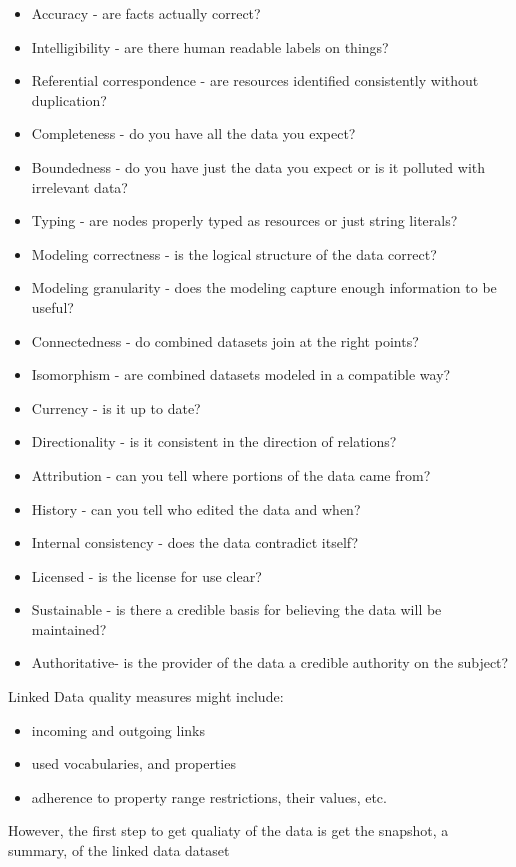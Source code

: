 \begin{itemize}
	\item Accuracy - are facts actually correct?
	\item Intelligibility - are there human readable labels on things?
	\item Referential correspondence - are resources identified consistently without duplication?
	\item Completeness - do you have all the data you expect?
	\item Boundedness - do you have just the data you expect or is it polluted with irrelevant data?
	\item Typing - are nodes properly typed as resources or just string literals?
	\item Modeling correctness - is the logical structure of the data correct?
	\item Modeling granularity - does the modeling capture enough information to be useful?
	\item Connectedness - do combined datasets join at the right points?
	\item Isomorphism - are combined datasets modeled in a compatible way?
	\item Currency - is it up to date?
	\item Directionality - is it consistent in the direction of relations?
	\item Attribution - can you tell where portions of the data came from?
	\item History - can you tell who edited the data and when?
	\item Internal consistency - does the data contradict itself?
	\item Licensed - is the license for use clear?
	\item Sustainable - is there a credible basis for believing the data will be maintained?
	\item Authoritative- is the provider of the data a credible authority on the subject?
\end{itemize}

Linked Data quality measures might include:
\begin{itemize}
	\item incoming and outgoing links
	\item used vocabularies, and properties
	\item adherence to property range restrictions, their values, etc.
\end{itemize}

However, the first step to get qualiaty of the data is get the snapshot, a summary, of the linked data dataset

